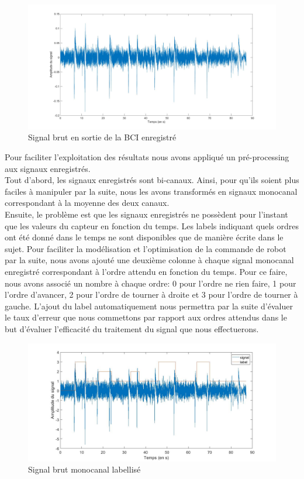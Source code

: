 \documentclass[11pt]{article}
\begin{document}
\begin{figure}[!h]
	\includegraphics[scale=0.25]{images/signalBCIinit.jpg}
	\caption{Signal brut en sortie de la BCI enregistré}
	\label{fig:duck}
\end{figure}

Pour faciliter l'exploitation des résultats nous avons appliqué un pré-processing aux signaux enregistrés. \\

Tout d'abord, les signaux enregistrés sont bi-canaux. Ainsi, pour qu'ils soient plus faciles à manipuler par la suite, nous les avons transformés en signaux monocanal correspondant à la moyenne des deux canaux. \\


Ensuite, le problème est que les signaux enregistrés ne possèdent pour l'instant que les valeurs du capteur en fonction du temps. Les labels indiquant quels ordres ont été donné dans le temps ne sont disponibles que de manière écrite dans le sujet. Pour faciliter la modélisation et l'optimisation de la commande de robot par la suite, nous avons ajouté une deuxième colonne à chaque signal monocanal enregistré correspondant à l'ordre attendu en fonction du temps. Pour ce faire, nous avons associé un nombre à chaque ordre: 0 pour l'ordre ne rien faire, 1 pour l'ordre d'avancer, 2 pour l'ordre de tourner à droite et 3 pour l'ordre de tourner à gauche. L'ajout du label automatiquement nous permettra par la suite d'évaluer le taux d'erreur que nous commettons par rapport aux ordres attendus dans le but d'évaluer l'efficacité du traitement du signal que nous effectuerons.

\begin{figure}[!h]
	\includegraphics[scale=0.35]{images/signalBCIlabele.jpg}
	\caption{Signal brut monocanal labellisé}
	\label{fig:duck}
\end{figure}
\end{document}
